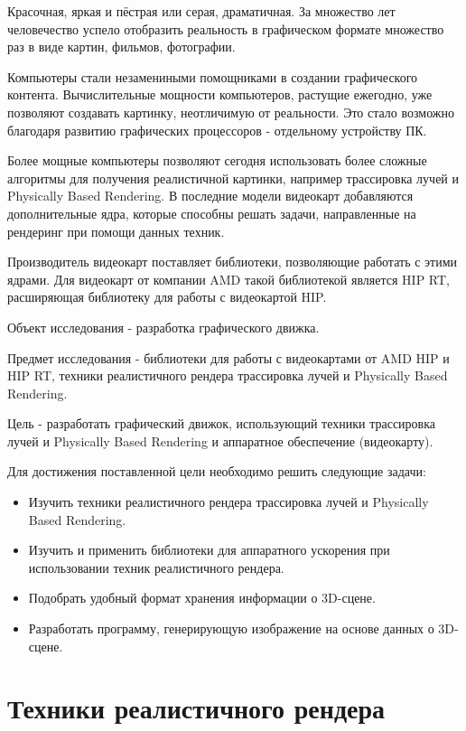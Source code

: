 \documentclass[a4paper,14pt]{extarticle}
\begin{document}
Красочная, яркая и пёстрая или серая, драматичная. За множество лет человечество успело
отобразить реальность в графическом формате множество раз в виде картин, фильмов, фотографии.

Компьютеры стали незамениными помощниками в создании графического контента.
Вычислительные мощности компьютеров, растущие ежегодно, уже позволяют создавать картинку, неотличимую от реальности.
Это стало возможно благодаря развитию графических процессоров - отдельному устройству ПК.

Более мощные компьютеры позволяют сегодня использовать более сложные алгоритмы для получения 
реалистичной картинки, например трассировка лучей и Physically Based Rendering. В последние модели 
видеокарт добавляются дополнительные ядра, которые способны решать задачи, направленные на рендеринг при помощи 
данных техник.

Производитель видеокарт поставляет библиотеки, позволяющие работать с этими ядрами. Для видеокарт от
компании AMD такой библиотекой является HIP RT, расширяющая библиотеку для работы с видеокартой HIP.

Объект исследования - разработка графического движка.

Предмет исследования - библиотеки для работы с видеокартами от AMD HIP и HIP RT, 
техники реалистичного рендера трассировка лучей и Physically Based Rendering.

Цель - разработать графический движок, использующий техники трассировка лучей и Physically Based Rendering и аппаратное обеспечение (видеокарту).

Для достижения поставленной цели необходимо решить следующие задачи:
\begin{itemize}
    \item Изучить техники реалистичного рендера трассировка лучей и Physically Based Rendering.
    \item Изучить и применить библиотеки для аппаратного ускорения при использовании техник реалистичного рендера.
    \item Подобрать удобный формат хранения информации о 3D-сцене.
    \item Разработать программу, генерирующую изображение на основе данных о 3D-сцене.
\end{itemize}

\newpage

\section{Техники реалистичного рендера}
\end{document}
